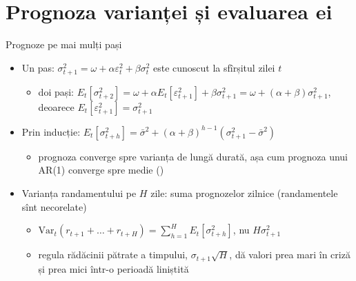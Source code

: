 \section{Prognoza varianței și evaluarea ei}

\begin{frame}{Prognoze pe mai mulți pași}
\itemsize{\small}
\begin{itemize}
    \item Un pas: $\sigma_{t+1}^2 = \omega + \alpha\varepsilon_t^2 + \beta\sigma_t^2$ este cunoscut la sfîrșitul zilei $t$
    \begin{itemize}
        \item doi pași: $E_t[\sigma_{t+2}^2] = \omega + \alpha E_t[\varepsilon_{t+1}^2] + \beta\sigma_{t+1}^2 = \omega + (\alpha + \beta)\sigma_{t+1}^2$, deoarece $E_t[\varepsilon_{t+1}^2] = \sigma_{t+1}^2$
    \end{itemize}
    \item Prin inducție: $E_t[\sigma_{t+h}^2] = \bar\sigma^2 + (\alpha + \beta)^{h-1}(\sigma_{t+1}^2 - \bar\sigma^2)$
    \begin{itemize}
        \item prognoza converge spre varianța de lungă durată, așa cum prognoza unui AR(1) converge spre medie ()
    \end{itemize}
    \item Varianța randamentului pe $H$ zile: suma prognozelor zilnice (randamentele sînt necorelate)
    \begin{itemize}
        \item $\mathrm{Var}_t(r_{t+1} + \dots + r_{t+H}) = \sum_{h=1}^{H} E_t[\sigma_{t+h}^2]$, nu $H\sigma_{t+1}^2$
        \item regula rădăcinii pătrate a timpului, $\sigma_{t+1}\sqrt{H}$, dă valori prea mari în criză și prea mici într-o perioadă liniștită
    \end{itemize}
\end{itemize}
\end{frame}


